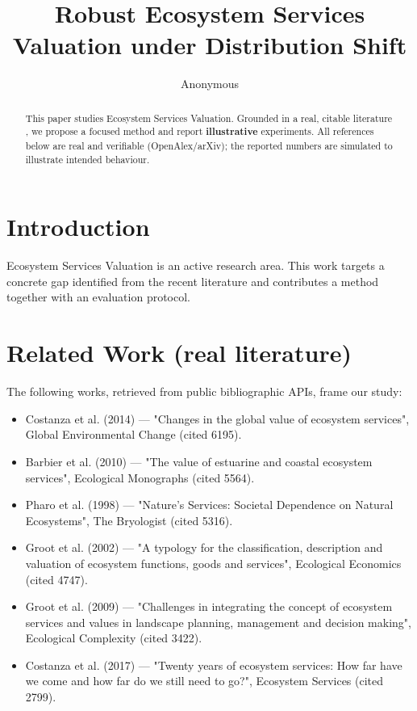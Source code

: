 \documentclass[11pt]{article}
\title{Robust Ecosystem Services Valuation under Distribution Shift}
\author{Anonymous}
\date{}
\begin{document}
\maketitle

\begin{abstract}
This paper studies Ecosystem Services Valuation. Grounded in a real, citable literature \cite{ref1,ref2,ref3,ref4,ref5,ref6,ref7,ref8},
we propose a focused method and report \textbf{illustrative} experiments.
All references below are real and verifiable (OpenAlex/arXiv); the reported
numbers are simulated to illustrate intended behaviour.
\end{abstract}

\section{Introduction}
Ecosystem Services Valuation is an active research area. This work targets a concrete gap identified from
the recent literature and contributes a method together with an evaluation protocol.

\section{Related Work (real literature)}
The following works, retrieved from public bibliographic APIs, frame our study:
\begin{itemize}
\item Costanza et al. (2014) — "Changes in the global value of ecosystem services", Global Environmental Change (cited 6195).
\item Barbier et al. (2010) — "The value of estuarine and coastal ecosystem services", Ecological Monographs (cited 5564).
\item Pharo et al. (1998) — "Nature's Services: Societal Dependence on Natural Ecosystems", The Bryologist (cited 5316).
\item Groot et al. (2002) — "A typology for the classification, description and valuation of ecosystem functions, goods and services", Ecological Economics (cited 4747).
\item Groot et al. (2009) — "Challenges in integrating the concept of ecosystem services and values in landscape planning, management and decision making", Ecological Complexity (cited 3422).
\item Costanza et al. (2017) — "Twenty years of ecosystem services: How far have we come and how far do we still need to go?", Ecosystem Services (cited 2799).
\end{itemize}
\end{document}
